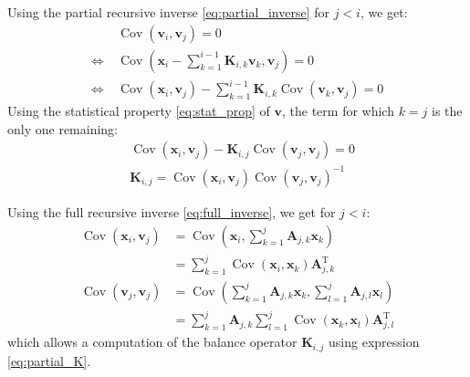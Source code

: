 \documentclass[12pt]{scrartcl}
\DeclareMathOperator{\Cov}{Cov}
\begin{document}
Using the partial recursive inverse \eqref{eq:partial_inverse} for $j < i$, we get:
\begin{align}
& \Cov\left(\mathbf{v}_i, \mathbf{v}_j\right) = 0 \nonumber \\
\Leftrightarrow \ & \Cov\left(\mathbf{x}_i - \sum_{k=1}^{i-1} \mathbf{K}_{i,k} \mathbf{v}_k, \mathbf{v}_j\right) = 0 \nonumber \\
\Leftrightarrow \ & \Cov\left(\mathbf{x}_i, \mathbf{v}_j\right) - \sum_{k=1}^{i-1} \mathbf{K}_{i,k} \Cov\left(\mathbf{v}_k, \mathbf{v}_j\right) = 0
\end{align}
Using the statistical property \eqref{eq:stat_prop} of $\mathbf{v}$, the term for which $k=j$ is the only one remaining:
\begin{align}
\label{eq:partial_K}
& \Cov\left(\mathbf{x}_i, \mathbf{v}_j\right) - \mathbf{K}_{i,j} \Cov\left(\mathbf{v}_j, \mathbf{v}_j\right) = 0 \nonumber \\
& \mathbf{K}_{i,j} = \Cov\left(\mathbf{x}_i, \mathbf{v}_j\right) \Cov\left(\mathbf{v}_j, \mathbf{v}_j\right)^{-1}
\end{align}

Using the full recursive inverse \eqref{eq:full_inverse}, we get for $j < i$:
\begin{subequations}
\begin{align}
\Cov\left(\mathbf{x}_i, \mathbf{v}_j\right) & = \Cov\left(\mathbf{x}_i, \sum_{k=1}^j \mathbf{A}_{j,k} \mathbf{x}_k\right) \nonumber \\
 & = \sum_{k=1}^j\Cov\left(\mathbf{x}_i, \mathbf{x}_k\right) \mathbf{A}_{j,k}^\mathrm{T} \\
\Cov\left(\mathbf{v}_j, \mathbf{v}_j\right) & = \Cov\left(\sum_{k=1}^j \mathbf{A}_{j,k} \mathbf{x}_k, \sum_{l=1}^j \mathbf{A}_{j,l} \mathbf{x}_l\right) \nonumber \\
 & = \sum_{k=1}^j \mathbf{A}_{j,k} \sum_{l=1}^j \Cov\left(\mathbf{x}_k, \mathbf{x}_l\right) \mathbf{A}_{j,l}^\mathrm{T}
\end{align}
\end{subequations}
which allows a computation of the balance operator $\mathbf{K}_{i,j}$ using expression \eqref{eq:partial_K}.
\end{document}

